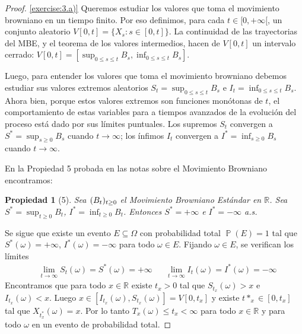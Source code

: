 \documentclass{article}
\DeclareMathOperator{\prob}{\mathbb{P}}
\newcommand{\realnum}{\mathbb{R}}
\newcommand{\brownian}{B}
\newtheorem{property}{Propiedad}
\theoremstyle{definition}
\begin{document}
\begin{proof} \ref{exercise:3.a)}
Queremos estudiar los valores que toma el movimiento browniano en un tiempo finito.
Por eso definimos, para cada \(t \in [0 , + \infty[\), un conjunto aleatorio \(V [0, t] = \{X_s : s \in [0, t]\}\).
La continuidad de las trayectorias del MBE, y el teorema de los valores intermedios, hacen de \(V [0, t]\) un intervalo cerrado: \(V [0, t] = [\sup_{0 \leq s \leq t} \brownian_s, \inf_{0 \leq s \leq t} \brownian_s]\).

Luego, para entender los valores que toma el movimiento browniano debemos estudiar sus valores extremos aleatorios \(S_t = \sup_{0 \leq s \leq t} \brownian_s\) e \(I_t = \inf_{0 \leq s \leq t} \brownian_s\).
Ahora bien, porque estos valores extremos son funciones monótonas de \(t\), el comportamiento de estas variables para a tiempos avanzados de la evolución del proceso está dado por sus límites puntuales.
Los supremos \(S_t\) convergen a \(S^* = \sup_{s \geq 0} \brownian_s\) cuando \(t \rightarrow \infty\); los ínfimos \(I_t\) convergen a \(I^* = \inf_{s \geq 0} \brownian_s\) cuando \(t \rightarrow \infty\).

En la Propiedad 5 probada en las notas sobre el Movimiento Browniano encontramos:
\begin{property}[5]
Sea \(\brownianProcess\) el Movimiento Browniano Estándar en \(\realnum\).
Sea \(S^* = \sup_{t \geq 0} \brownian_t\), \(I^* = \inf_{t \geq 0} \brownian_t\).
Entonces \(S^* = + \infty\) e \(I^* = - \infty\) a.s.
\end{property}
Se sigue que existe un evento \(E \subseteq \Omega\) con probabilidad total \(\prob(E) = 1\) tal que \(S^*(\omega) = + \infty\), \(I^*(\omega) = - \infty\) para todo \(\omega \in E\).
Fijando \(\omega \in E\), se verifican los límites 
\begin{align}
	&\lim_{t \rightarrow \infty} S_t(\omega) 
		= S^*(\omega) 
		= + \infty
	&
	&\lim_{t \rightarrow \infty} I_t(\omega) 
		= I^*(\omega) 
		= - \infty
\end{align}
Encontramos que para todo \(x \in \realnum\) existe \(t_x > 0\) tal que \(S_{t_x}(\omega) > x\) e \(I_{t_x}(\omega) < x\).
Luego \(x \in [I_{t_x}(\omega), S_{t_x}(\omega)] = V [0, t_x]\) y existe \(t*_x \in [0, t_x]\) tal que \(X_{t^*_x}(\omega) = x\).
Por lo tanto \(T_x(\omega) \leq t_x < \infty\) para todo \(x \in \realnum\) y para todo \(\omega\) en un evento de probabilidad total.
\end{proof}
\end{document}
